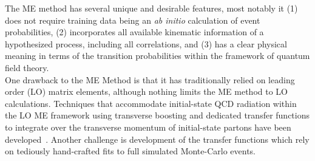 
The ME method has several unique and desirable features, most notably it (1) does not require training data being an \emph{ab initio} calculation of event probabilities, (2) incorporates all available kinematic information of a hypothesized process, including all correlations, and (3) has a clear physical meaning in terms of the transition probabilities within the framework of quantum field theory.\\

One drawback to the ME Method is that it has traditionally relied on leading order (LO) matrix elements, although nothing limits the ME method to LO calculations. Techniques that accommodate initial-state QCD radiation within the LO ME framework using transverse boosting and dedicated transfer functions to integrate over the transverse momentum of initial-state partons have been developed~\cite{Alwall:2010cq}.
Another challenge is development of the transfer functions which rely on tediously hand-crafted fits to full simulated Monte-Carlo events.\\

